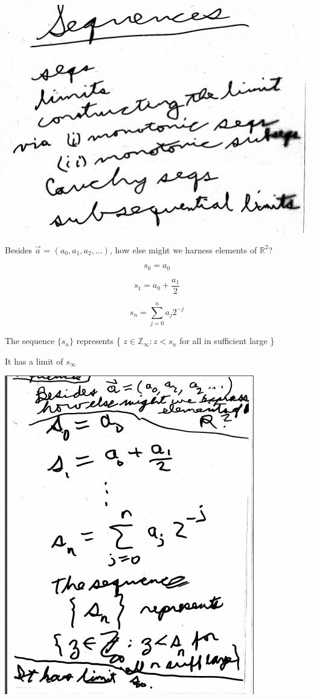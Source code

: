 \documentclass[10pt,a4paper]{article}
\begin{document}
{{\includegraphics[scale=.8]{Pages/S&L_page1}

\newpage


Besides $\vec{a}$ = $(a{_0}, a_{1}, a_{2}, ...)$, how else might we harness elements of $\mathbb {R}^{2}$?

$$s_0 = a_{0}$$

$$s_1 = a_{0} + \frac{a_{1}}{2}$$



$$s_{n} = \sum_{j=0}^{n} a_{j} 2^{-j}$$




The sequence $\{s_{n}\}$ represents \{ ${z \in \mathbb{Z}_{\infty} : z < s_{n}} $ for all in sufficient large \}

It has a limit of $s_{\infty}$

\includegraphics[scale=.8]{Pages/S&L_page2}

}}
\end{document}

